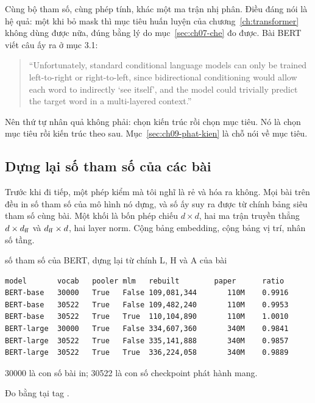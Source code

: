 Cùng bộ tham số, cùng phép tính, khác một ma trận nhị phân. Điều đáng nói là hệ
quả: một khi bỏ mask thì mục tiêu huấn luyện của chương~\ref{ch:transformer}
không dùng được nữa, đúng bằng lý do mục~\ref{sec:ch07-che} đo được. Bài BERT
viết câu ấy ra ở mục 3.1:

\begin{quote}
\enquote{Unfortunately, standard conditional language models can only be trained
left-to-right or right-to-left, since bidirectional conditioning would allow
each word to indirectly \enquote{see itself}, and the model could trivially
predict the target word in a multi-layered context.}
\end{quote}

Nên thứ tự nhân quả không phải: chọn kiến trúc rồi chọn mục tiêu. Nó là chọn
mục tiêu rồi kiến trúc theo sau. Mục~\ref{sec:ch09-phat-kien} là chỗ nói về mục
tiêu.

\subsection*{Dựng lại số tham số của các bài}

%
Trước khi đi tiếp, một phép kiểm mà tôi nghĩ là rẻ và hóa ra không. Mọi bài
trên đều in số tham số của mô hình nó dựng, và số ấy suy ra được từ chính bảng
siêu tham số cùng bài. Một khối là bốn phép chiếu \(d \times d\), hai ma trận
truyền thẳng \(d \times d_{\mathrm{ff}}\) và \(d_{\mathrm{ff}} \times d\), hai layer norm. Cộng bảng
embedding, cộng bảng vị trí, nhân số tầng.

\begin{measured}{số tham số của BERT, dựng lại từ chính L, H và A của bài}
\begin{verbatim}
model       vocab   pooler mlm   rebuilt        paper      ratio
BERT-base   30000   True   False 109,081,344       110M    0.9916
BERT-base   30522   True   False 109,482,240       110M    0.9953
BERT-base   30522   True   True  110,104,890       110M    1.0010
BERT-large  30000   True   False 334,607,360       340M    0.9841
BERT-large  30522   True   False 335,141,888       340M    0.9857
BERT-large  30522   True   True  336,224,058       340M    0.9889
\end{verbatim}

30000 là con số bài in; 30522 là con số checkpoint phát hành mang.

Đo bằng  tại tag .
\end{measured}

